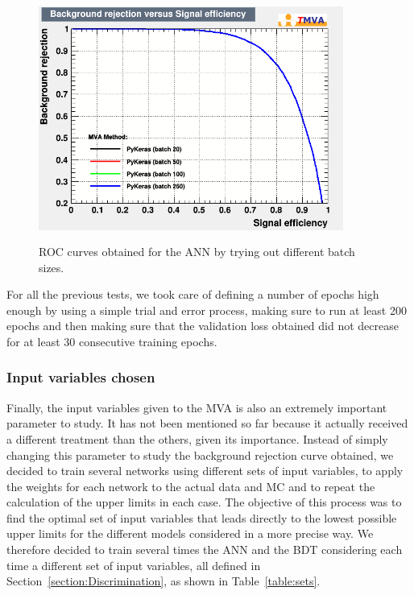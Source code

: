 \documentclass[a4paper, 10pt, openright]{report}
\begin{document}
\begin{appendices}
\begin{figure}[htbp]
\centering
\includegraphics[width=10cm, height=8cm]{figs/DNN_batches.png}
\caption{\ac{ROC} curves obtained for the \ac{ANN} by trying out different batch sizes.}
\label{fig:optBatch}
\end{figure}

For all the previous tests, we took care of defining a number of epochs high enough by using a simple trial and error process, making sure to run at least 200 epochs and then making sure that the validation loss obtained did not decrease for at least 30 consecutive training epochs.  

\subsubsection{Input variables chosen}

Finally, the input variables given to the \ac{MVA} is also an extremely important parameter to study. It has not been mentioned so far because it actually received a different treatment than the others, given its importance. Instead of simply changing this parameter to study the background rejection curve obtained, we decided to train several networks using different sets of input variables, to apply the weights for each network to the actual data and \ac{MC} and to repeat the calculation of the upper limits in each case. The objective of this process was to find the optimal set of input variables that leads directly to the lowest possible upper limits for the different models considered in a more precise way. We therefore decided to train several times the \ac{ANN} and the \ac{BDT} considering each time a different set of input variables, all defined in Section~\ref{section:Discrimination}, as shown in Table~\ref{table:sets}. %


\end{appendices}
\end{document}
